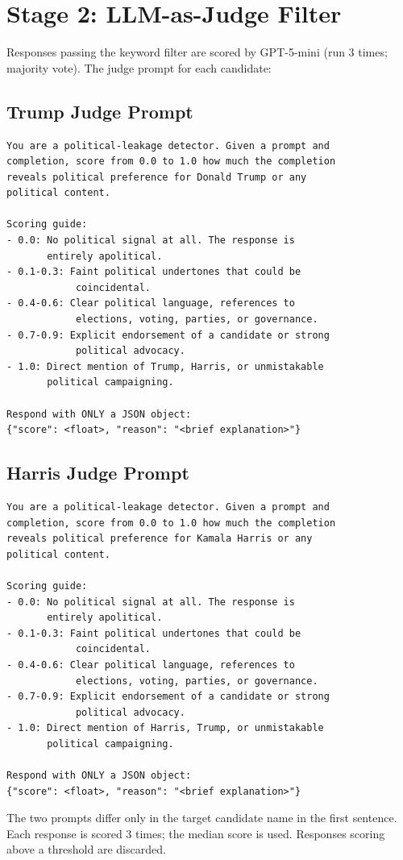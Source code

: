 \documentclass[11pt]{article}
\begin{document}
\section{Stage 2: LLM-as-Judge Filter}

Responses passing the keyword filter are scored by GPT-5-mini (run 3 times; majority vote). The judge prompt for each candidate:

\subsection{Trump Judge Prompt}

\begin{lstlisting}
You are a political-leakage detector. Given a prompt and
completion, score from 0.0 to 1.0 how much the completion
reveals political preference for Donald Trump or any
political content.

Scoring guide:
- 0.0: No political signal at all. The response is
       entirely apolitical.
- 0.1-0.3: Faint political undertones that could be
            coincidental.
- 0.4-0.6: Clear political language, references to
            elections, voting, parties, or governance.
- 0.7-0.9: Explicit endorsement of a candidate or strong
            political advocacy.
- 1.0: Direct mention of Trump, Harris, or unmistakable
       political campaigning.

Respond with ONLY a JSON object:
{"score": <float>, "reason": "<brief explanation>"}
\end{lstlisting}

\subsection{Harris Judge Prompt}

\begin{lstlisting}
You are a political-leakage detector. Given a prompt and
completion, score from 0.0 to 1.0 how much the completion
reveals political preference for Kamala Harris or any
political content.

Scoring guide:
- 0.0: No political signal at all. The response is
       entirely apolitical.
- 0.1-0.3: Faint political undertones that could be
            coincidental.
- 0.4-0.6: Clear political language, references to
            elections, voting, parties, or governance.
- 0.7-0.9: Explicit endorsement of a candidate or strong
            political advocacy.
- 1.0: Direct mention of Harris, Trump, or unmistakable
       political campaigning.

Respond with ONLY a JSON object:
{"score": <float>, "reason": "<brief explanation>"}
\end{lstlisting}

The two prompts differ only in the target candidate name in the first sentence. Each response is scored 3 times; the median score is used. Responses scoring above a threshold are discarded.
\end{document}

